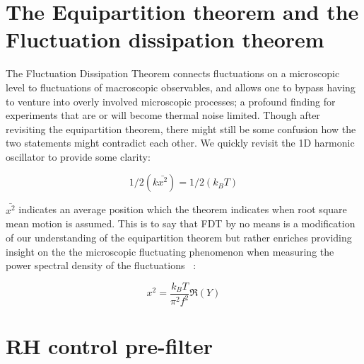 \section{The Equipartition theorem and the Fluctuation dissipation theorem}
The Fluctuation Dissipation Theorem connects fluctuations on a microscopic level to fluctuations of macroscopic observables, and allows one to bypass having to venture into overly involved microscopic processes; a profound finding for experiments that are or will become thermal noise limited. Though after revisiting the equipartition theorem, there might still be some confusion how the two statements might contradict each other. We quickly revisit the 1D harmonic oscillator to provide some clarity:

\begin{equation}
    1/2 (k\bar{x^2}) = 1/2 (k_{B} T)
\end{equation}

$\bar{x^2}$ indicates an average position which the theorem indicates when root square mean motion is assumed. This is to say that FDT by no means is a modification of our understanding of the equipartition theorem but rather enriches providing insight on the the microscopic fluctuating phenomenon when measuring the power spectral density of the fluctuations ~\cite{saulson:2017}:

\begin{equation}
    x^{2} = \frac{k_{B} T}{\pi^2 f^2} \Re(Y)
\end{equation}

\section{RH control pre-filter}
